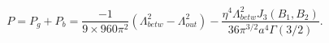 \begin{equation}
 P=P_{g}+P_{b}=\frac{-1}{9\times 960\pi^{2}}
 (\Lambda_{betw}^{2}-\Lambda_{out}^{2})-\frac{\eta^{4}\Lambda_{betw
}^{2}J_3(B_1,B_2)}{36\pi ^{3/2}a^{4}\Gamma (3/2)}.
 \end{equation}

